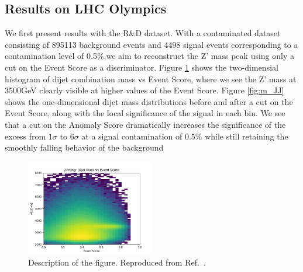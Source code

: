 \documentclass[letterpaper,11pt]{article}
\begin{document}
\subsection{Results on LHC Olympics}
\label{sec:results}


We first present results with the R\&D dataset. With a contaminated dataset consisting of 895113 background events and 4498 signal events corresponding to a contamination level of 0.5\%,we aim to reconstruct the Z' mass peak using only a cut on the Event Score as a discriminator. Figure \ref{fig:m_v_s} shows the two-dimensial histogram of dijet combination mass vs Event Score, where we see the Z' mass at 3500GeV clearly visible at higher values of the Event Score. Figure \ref{fig:m_JJ} shows the one-dimensional dijet mass distributions before and after a cut on the Event Score, along with the local significance of the signal in each bin. We see that a cut on the Anomaly Score dramatically increases the significance of the excess from $1\sigma$ to $6\sigma$ at a signal contamination of 0.5\% while still retaining the smoothly falling behavior of the background

\begin{figure}[h!]
\centering
\includegraphics[width=0.5\textwidth]{imgs/ProcR_2Prong_Contaminated_10p0_2Prong_Contaminated_10p0_Weights_Event_ConstOnly_Avg_JJ_M_vs_Event_Score.png}
\caption{Description of the figure.  Reproduced from Ref.~\cite{Nachman:2020lpy}.}
\label{fig:m_v_s}
\end{figure}
\end{document}
